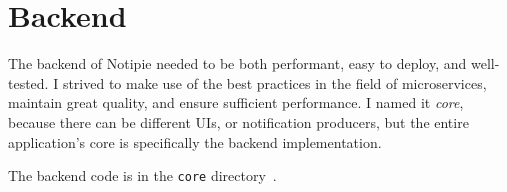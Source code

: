 \section{Backend}\label{sec:backend}

The backend of Notipie
needed to be both performant,
easy to deploy,
and well-tested.
I strived to make use of the best practices
in the field of microservices,
maintain great quality,
and ensure sufficient performance.
I named it \textit{core},
because there can be different UIs,
or notification producers,
but the entire application's core
is specifically the backend implementation.

The backend code
is in the
\texttt{core} directory~\cite{sewera_notipie_2022}.




